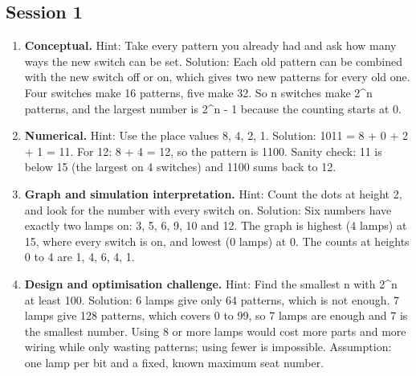 \documentclass[11pt,a4paper]{article}
\begin{document}
\subsection*{Session 1}
\begin{enumerate}[nosep]
\item \textbf{Conceptual.} Hint: Take every pattern you already had and ask how many ways the new switch can be set. Solution: Each old pattern can be combined with the new switch off or on, which gives two new patterns for every old one. Four switches make 16 patterns, five make 32. So n switches make 2\textasciicircum{}n patterns, and the largest number is 2\textasciicircum{}n - 1 because the counting starts at 0.
\item \textbf{Numerical.} Hint: Use the place values 8, 4, 2, 1. Solution: 1011 = 8 + 0 + 2 + 1 = 11. For 12: 8 + 4 = 12, so the pattern is 1100. Sanity check: 11 is below 15 (the largest on 4 switches) and 1100 sums back to 12.
\item \textbf{Graph and simulation interpretation.} Hint: Count the dots at height 2, and look for the number with every switch on. Solution: Six numbers have exactly two lamps on: 3, 5, 6, 9, 10 and 12. The graph is highest (4 lamps) at 15, where every switch is on, and lowest (0 lamps) at 0. The counts at heights 0 to 4 are 1, 4, 6, 4, 1.
\item \textbf{Design and optimisation challenge.} Hint: Find the smallest n with 2\textasciicircum{}n at least 100. Solution: 6 lamps give only 64 patterns, which is not enough. 7 lamps give 128 patterns, which covers 0 to 99, so 7 lamps are enough and 7 is the smallest number. Using 8 or more lamps would cost more parts and more wiring while only wasting patterns; using fewer is impossible. Assumption: one lamp per bit and a fixed, known maximum seat number.
\end{enumerate}
\end{document}
